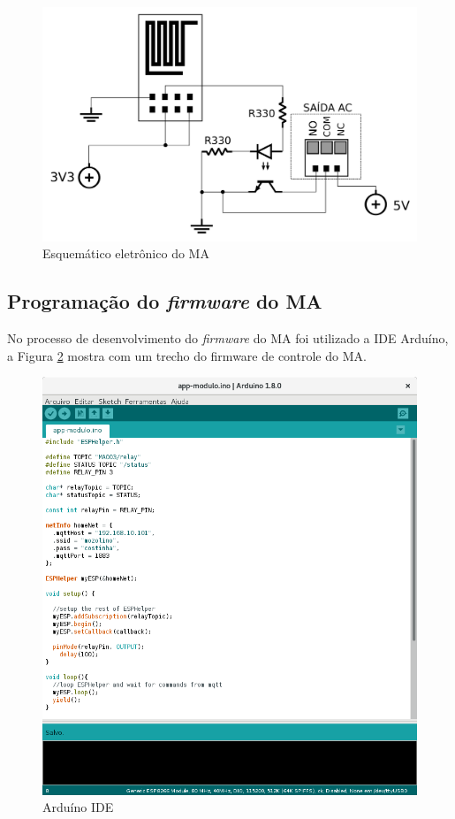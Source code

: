 \begin{figure}[H]
\caption{\label{sch-ma} Esquemático eletrônico do MA}
\includegraphics[scale=0.25]{img/sch-ma.png}
\end{figure}

\subsection{Programação do \textit{firmware} do MA}
No processo de desenvolvimento do \textit{firmware} do MA foi utilizado a IDE Arduíno, a Figura \ref{arduino-ide} mostra com um trecho do firmware de controle do MA.

\begin{figure}[H]
\caption{\label{arduino-ide} Arduíno IDE}
\includegraphics[scale=0.3]{img/ide-arduino.png}
\end{figure}

